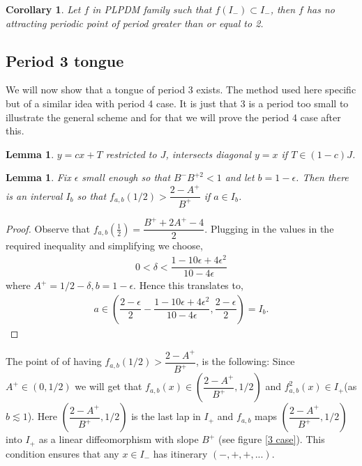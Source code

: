 \documentclass[12pt]{amsart}
\numberwithin{equation}{section}
\newtheorem{lemma}[theorem]{Lemma}
\newtheorem{corollary}[theorem]{Corollary}
\theoremstyle{remark}
\begin{document}
\begin{corollary}
     Let $f$ in PLPDM family such that $f(I_-)\subset I_-$, then $f$ has  no attracting periodic point of period greater than or equal to 2.
\end{corollary}




\subsection{\textbf{Period 3 tongue}}

\vspace{.3cm}

We will now show that a tongue of period 3 exists. The method used here specific but of a similar idea with period 4 case. It is just that  3 is a period too small to illustrate the general scheme and for that we will prove the period 4 case after this. 



\begin{lemma}\label{int line}
     $y=cx+T$ restricted to $J$, intersects diagonal $y=x$ if $T \in (1-c)J$.
\end{lemma}
\begin{lemma}\label{good interval period 3}
     Fix $\epsilon $ small enough so that  $B^-B^{+{2}}<1$ and let $b=1-\epsilon$.  Then there is an interval $I_b$  so that $f_{a,b}(1/2)>\dfrac{2-A^+}{B^+}$ if $a \in I_b$.  
     
\end{lemma}
\begin{proof}
    Observe that $f_{a,b}(\frac{1}{2})=\dfrac{B^+ +2A^+ -4}{2}$. Plugging in the values in the required inequality and simplifying we choose,
\begin{align*}
    0<\delta < \dfrac{1-10\epsilon+4\epsilon^2}{10-4\epsilon}
\end{align*} 
where $A^+=1/2-\delta,b=1-\epsilon$. Hence this translates to,
\begin{align*}
    a \in  \left(\dfrac{2-\epsilon}{2}-\dfrac{1-10\epsilon+4\epsilon^2}{10-4\epsilon},\dfrac{2-\epsilon}{2}\right)=I_b. 
\end{align*}
 
\end{proof}
The point of of having  $f_{a,b}(1/2)>\dfrac{2-A^+}{B^+}$, is the following:  Since $A^+ \in (0,1/2)$ we will get that $f_{a,b}(x)\in \left(\dfrac{2-A^+}{B^+},1/2\right)$ and $f_{a,b}^2(x) \in I_+$(as $b \lesssim 1$). Here $\left(\dfrac{2-A^+}{B^+},1/2\right)$ is the last lap in $I_+$  and $f_{a,b}$ maps $\left(\dfrac{2-A^+}{B^+},1/2\right)$ into $I_+$ as a linear diffeomorphism with slope $B^+$ (see figure \ref{3 case}). This condition ensures that any $x \in I_-$ has itinerary $(-,+,+,...)$. 
 
\end{document}
